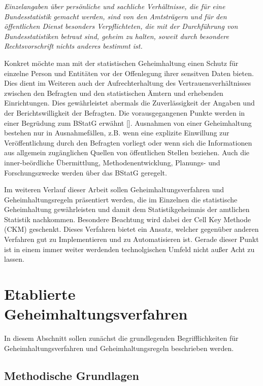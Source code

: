 \textit{\glqq Einzelangaben über persönliche und sachliche Verhältnisse, die für eine Bundesstatistik gemacht werden, sind von den Amtsträgern und für den öffentlichen Dienst besonders Verpflichteten, die mit der Durchführung von Bundesstatistiken betraut sind, geheim zu halten, soweit durch besondere Rechtsvorschrift nichts anderes bestimmt ist.\grqq{}}

Konkret möchte man mit der statistischen Geheimhaltung einen Schutz für einzelne Person und Entitäten vor der Offenlegung ihrer sensitven Daten bieten. Dies dient im Weiteren auch der Aufrechterhaltung des Vertrauensverhältnisses zwischen den Befragten und den statistischen Ämtern und erhebenden Einrichtungen. Dies gewährleistet abermals die Zuverlässigkeit der Angaben und der Berichtswilligkeit der Befragten. Die vorausgegangenen Punkte werden in einer Begrüdung zum BStatG erwähnt [\cite{Nickl}]. Ausnahmen von einer Geheimhaltung bestehen nur in Ausnahmefällen, z.B. wenn eine explizite Einwillung zur Veröffentlichung durch den Befragten vorliegt oder wenn sich die Informationen aus allgemein zugänglichen Quellen von öffentlichen Stellen beziehen. Auch die inner-beördliche Übermittlung, Methodenentwicklung, Planungs- und Forschungszwecke werden über das BStatG geregelt.

Im weiteren Verlauf dieser Arbeit sollen Geheimhaltungsverfahren und Geheimhaltungsregeln präsentiert werden, die im Einzelnen die statistische Geheimhaltung gewährleisten und damit dem Statistikgeheimnis der amtlichen Statistik nachkommen. Besondere Beachtung wird dabei der Cell Key Methode (CKM) geschenkt. Dieses Verfahren bietet ein Ansatz, welcher gegenüber anderen Verfahren gut zu Implementieren und zu Automatisieren ist. Gerade dieser Punkt ist in einem immer weiter werdenden technolgischen Umfeld nicht au\ss er Acht zu lassen.


\section{Etablierte Geheimhaltungsverfahren}

In diesem Abschnitt sollen zunächst die grundlegenden Begrifflichkeiten für Geheimhaltungsverfahren und Geheimhaltungsregeln beschrieben werden. 

\subsection{Methodische Grundlagen}

